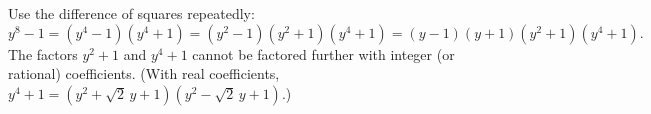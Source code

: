 Use the difference of squares repeatedly:
\[
y^8-1=(y^4-1)(y^4+1)=(y^2-1)(y^2+1)(y^4+1)=\boxed{(y-1)(y+1)(y^2+1)(y^4+1)}.
\]
The factors $y^2+1$ and $y^4+1$ cannot be factored further with integer (or rational) coefficients. (With real coefficients, $y^4+1=(y^2+\sqrt2\,y+1)(y^2-\sqrt2\,y+1)$.)
